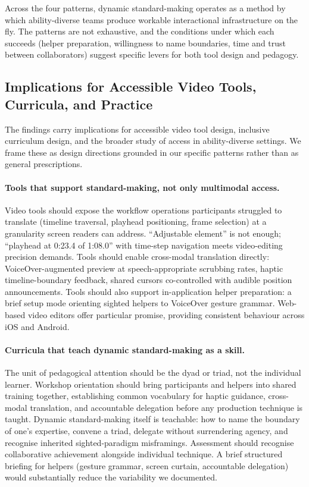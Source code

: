 Across the four patterns, dynamic standard-making operates as a method by which ability-diverse teams produce workable interactional infrastructure on the fly. The patterns are not exhaustive, and the conditions under which each succeeds (helper preparation, willingness to name boundaries, time and trust between collaborators) suggest specific levers for both tool design and pedagogy.

\subsection{Implications for Accessible Video Tools, Curricula, and Practice}

The findings carry implications for accessible video tool design, inclusive curriculum design, and the broader study of access in ability-diverse settings. We frame these as design directions grounded in our specific patterns rather than as general prescriptions.

\paragraph{Tools that support standard-making, not only multimodal access.}
Video tools should expose the workflow operations participants struggled to translate (timeline traversal, playhead positioning, frame selection) at a granularity screen readers can address. ``Adjustable element'' is not enough; ``playhead at 0:23.4 of 1:08.0'' with time-step navigation meets video-editing precision demands. Tools should enable cross-modal translation directly: VoiceOver-augmented preview at speech-appropriate scrubbing rates, haptic timeline-boundary feedback, shared cursors co-controlled with audible position announcements. Tools should also support in-application helper preparation: a brief setup mode orienting sighted helpers to VoiceOver gesture grammar. Web-based video editors offer particular promise, providing consistent behaviour across iOS and Android.

\paragraph{Curricula that teach dynamic standard-making as a skill.}
The unit of pedagogical attention should be the dyad or triad, not the individual learner. Workshop orientation should bring participants and helpers into shared training together, establishing common vocabulary for haptic guidance, cross-modal translation, and accountable delegation before any production technique is taught. Dynamic standard-making itself is teachable: how to name the boundary of one's expertise, convene a triad, delegate without surrendering agency, and recognise inherited sighted-paradigm misframings. Assessment should recognise collaborative achievement alongside individual technique. A brief structured briefing for helpers (gesture grammar, screen curtain, accountable delegation) would substantially reduce the variability we documented.

